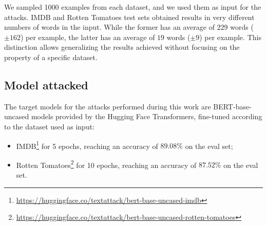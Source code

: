 We sampled 1000 examples from each dataset, and we used them as input for the attacks.
IMDB and Rotten Tomatoes test sets obtained results in very different numbers of words in the input. While the former has an average of $229$ words ($\pm162$) per example, the latter has an average of $19$ words ($\pm9$) per example.
This distinction allows generalizing the results achieved without focusing on the property of a specific dataset. 

\subsection{Model attacked}\label{subsec:model-attacked}

The target models for the attacks performed during this work are BERT-base-uncased models provided by the Hugging Face Transformers, 
fine-tuned according to the dataset used as input:
\begin{itemize}
    \item IMDB\footnote{\url{https://huggingface.co/textattack/bert-base-uncased-imdb}} for 5 epochs, reaching an accuracy of $89.08\%$ on the eval set;
    \item Rotten Tomatoes\footnote{\url{https://huggingface.co/textattack/bert-base-uncased-rotten-tomatoes}} for 10 epochs, reaching an accuracy of $87.52\%$ on the eval set.
\end{itemize}

